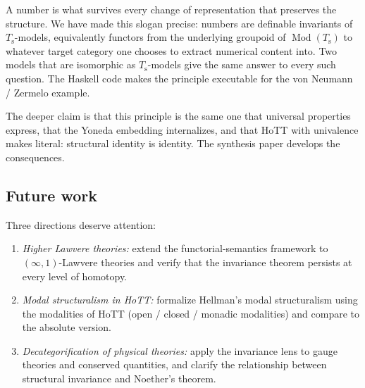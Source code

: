 \documentclass[12pt]{article}
\theoremstyle{definition}
\theoremstyle{remark}
\newcommand{\Mod}[1]{\operatorname{Mod}(#1)}
\newcommand{\succop}{\mathrm{s}}
\begin{document}
A number is what survives every change of representation that preserves the structure. We have made this slogan precise: numbers are definable invariants of $T_\succop$-models, equivalently functors from the underlying groupoid of $\Mod{T_\succop}$ to whatever target category one chooses to extract numerical content into. Two models that are isomorphic as $T_\succop$-models give the same answer to every such question. The Haskell code makes the principle executable for the von Neumann / Zermelo example.

The deeper claim is that this principle is the same one that universal properties express, that the Yoneda embedding internalizes, and that HoTT with univalence makes literal: structural identity is identity. The synthesis paper develops the consequences.

\subsection*{Future work}

Three directions deserve attention:
\begin{enumerate}
  \item \emph{Higher Lawvere theories:} extend the functorial-semantics framework to $(\infty,1)$-Lawvere theories and verify that the invariance theorem persists at every level of homotopy.
  \item \emph{Modal structuralism in HoTT:} formalize Hellman's modal structuralism using the modalities of HoTT (open / closed / monadic modalities) and compare to the absolute version.
  \item \emph{Decategorification of physical theories:} apply the invariance lens to gauge theories and conserved quantities, and clarify the relationship between structural invariance and Noether's theorem.
\end{enumerate}
\end{document}

